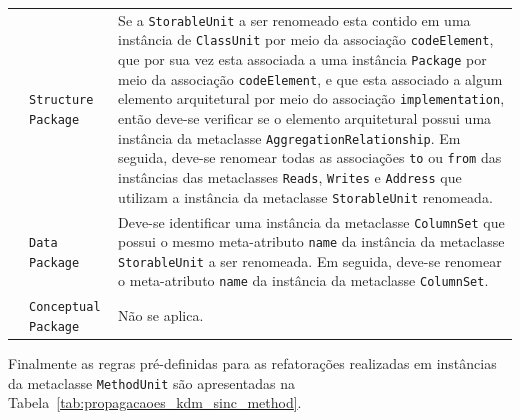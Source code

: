 \begin{longtable}{ | m{1.9cm} | m{3.57cm}| m{9.3cm} | }
\cline{2-3}
& \texttt{Structure Package} & Se a \texttt{StorableUnit} a ser renomeado esta contido em uma instância de \texttt{ClassUnit} por meio da associação \texttt{codeElement}, que por sua vez esta associada a uma instância \texttt{Package} por meio da associação \texttt{codeElement}, e que esta associado a algum elemento arquitetural por meio do associação \texttt{implementation}, então deve-se verificar se o elemento arquitetural possui uma instância da metaclasse \texttt{AggregationRelationship}. Em seguida, deve-se renomear todas as associações \texttt{to} ou \texttt{from} das instâncias das metaclasses \texttt{Reads}, \texttt{Writes} e \texttt{Address} que utilizam a instância da metaclasse \texttt{StorableUnit} renomeada. \tabularnewline
\cline{2-3}
& \texttt{Data Package} & Deve-se identificar uma instância da metaclasse \texttt{ColumnSet} que possui o mesmo meta-atributo \texttt{name} da instância da metaclasse \texttt{StorableUnit} a ser renomeada. Em seguida, deve-se renomear o meta-atributo \texttt{name} da instância da metaclasse \texttt{ColumnSet}. \tabularnewline
\cline{2-3}
& \texttt{Conceptual Package} & Não se aplica. \tabularnewline
 \end{longtable}


Finalmente as regras pré-definidas para as refatorações realizadas em instâncias da metaclasse \texttt{MethodUnit} são apresentadas na Tabela~\ref{tab:propagacaoes_kdm_sinc_method}.

